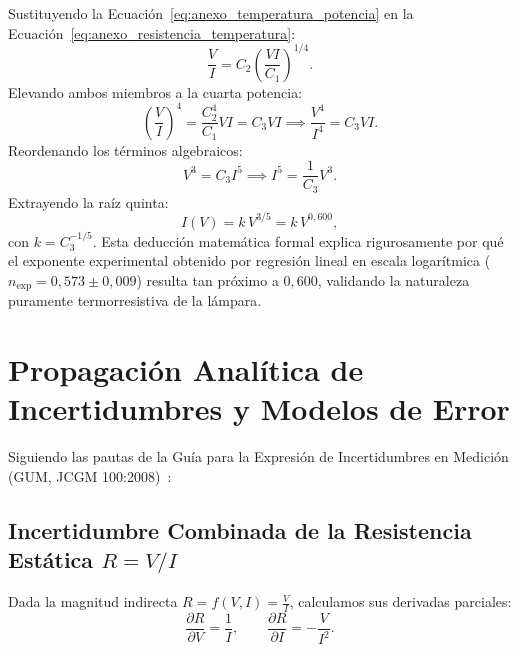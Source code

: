 \begin{appendices}
Sustituyendo la Ecuación~\eqref{eq:anexo_temperatura_potencia} en la Ecuación~\eqref{eq:anexo_resistencia_temperatura}:
\begin{equation}
    \frac{V}{I} = C_2 \left( \frac{V I}{C_1} \right)^{1/4}.
\end{equation}
Elevando ambos miembros a la cuarta potencia:
\begin{equation}
    \left( \frac{V}{I} \right)^4 = \frac{C_2^4}{C_1} V I = C_3 V I \implies \frac{V^4}{I^4} = C_3 V I.
\end{equation}
Reordenando los términos algebraicos:
\begin{equation}
    V^3 = C_3 I^5 \implies I^5 = \frac{1}{C_3} V^3.
\end{equation}
Extrayendo la raíz quinta:
\begin{equation}
    \boxed{I(V) = k \, V^{3/5} = k \, V^{0{,}600},}
    \label{eq:anexo_exponente_teorico_foquito}
\end{equation}
con $k = C_3^{-1/5}$. Esta deducción matemática formal explica rigurosamente por qué el exponente experimental obtenido por regresión lineal en escala logarítmica ($n_{\text{exp}} = 0{,}573 \pm 0{,}009$) resulta tan próximo a $0{,}600$, validando la naturaleza puramente termorresistiva de la lámpara.

\section{Propagación Analítica de Incertidumbres y Modelos de Error}
\label{anexo:propagacion_errores}

Siguiendo las pautas de la Guía para la Expresión de Incertidumbres en Medición (GUM, JCGM 100:2008)~\cite{gum}:

\subsection{Incertidumbre Combinada de la Resistencia Estática \texorpdfstring{$R = V/I$}{R = V/I}}
Dada la magnitud indirecta $R = f(V, I) = \frac{V}{I}$, calculamos sus derivadas parciales:
\begin{equation}
    \frac{\partial R}{\partial V} = \frac{1}{I}, \qquad \frac{\partial R}{\partial I} = -\frac{V}{I^2}.
\end{equation}


\end{appendices}
